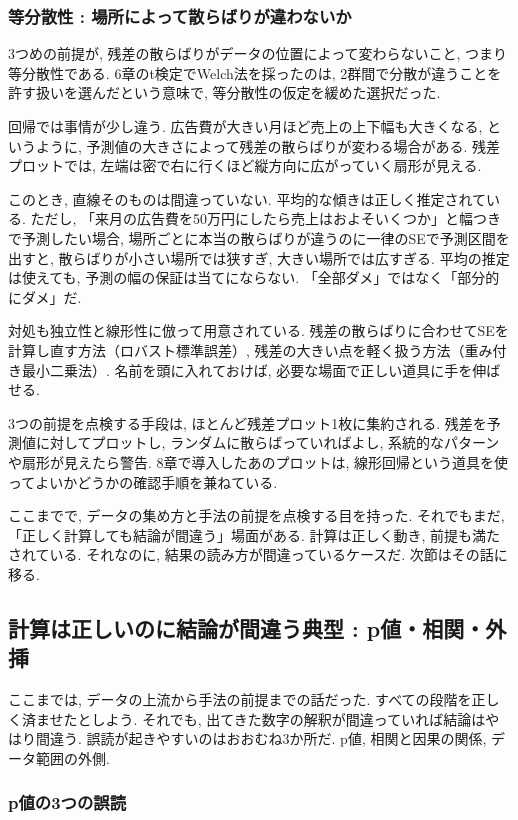 \subsubsection*{等分散性 : 場所によって散らばりが違わないか}

3つめの前提が, 残差の散らばりがデータの位置によって変わらないこと, つまり等分散性である.
6章のt検定でWelch法を採ったのは, 2群間で分散が違うことを許す扱いを選んだという意味で, 等分散性の仮定を緩めた選択だった.

回帰では事情が少し違う.
広告費が大きい月ほど売上の上下幅も大きくなる, というように, 予測値の大きさによって残差の散らばりが変わる場合がある.
残差プロットでは, 左端は密で右に行くほど縦方向に広がっていく扇形が見える.

このとき, 直線そのものは間違っていない.
平均的な傾きは正しく推定されている.
ただし, 「来月の広告費を50万円にしたら売上はおよそいくつか」と幅つきで予測したい場合, 場所ごとに本当の散らばりが違うのに一律のSEで予測区間を出すと, 散らばりが小さい場所では狭すぎ, 大きい場所では広すぎる.
平均の推定は使えても, 予測の幅の保証は当てにならない. 「全部ダメ」ではなく「部分的にダメ」だ.

対処も独立性と線形性に倣って用意されている.
残差の散らばりに合わせてSEを計算し直す方法（ロバスト標準誤差）, 残差の大きい点を軽く扱う方法（重み付き最小二乗法）.
名前を頭に入れておけば, 必要な場面で正しい道具に手を伸ばせる.

3つの前提を点検する手段は, ほとんど残差プロット1枚に集約される.
残差を予測値に対してプロットし, ランダムに散らばっていればよし, 系統的なパターンや扇形が見えたら警告.
8章で導入したあのプロットは, 線形回帰という道具を使ってよいかどうかの確認手順を兼ねている.

ここまでで, データの集め方と手法の前提を点検する目を持った.
それでもまだ, 「正しく計算しても結論が間違う」場面がある.
計算は正しく動き, 前提も満たされている. それなのに, 結果の読み方が間違っているケースだ.
次節はその話に移る.


\subsection{計算は正しいのに結論が間違う典型 : p値・相関・外挿}

ここまでは, データの上流から手法の前提までの話だった.
すべての段階を正しく済ませたとしよう.
それでも, 出てきた数字の解釈が間違っていれば結論はやはり間違う.
誤読が起きやすいのはおおむね3か所だ. p値, 相関と因果の関係, データ範囲の外側.

\subsubsection*{p値の3つの誤読}

